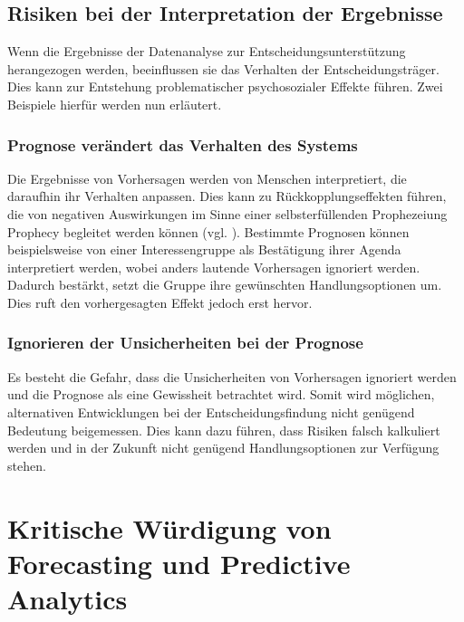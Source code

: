 \subsection{Risiken bei der Interpretation der Ergebnisse}

Wenn die Ergebnisse der Datenanalyse zur Entscheidungsunterstützung herangezogen
werden, beeinflussen sie das Verhalten der Entscheidungsträger. Dies kann zur
Entstehung problematischer psychosozialer Effekte führen. Zwei Beispiele hierfür
werden nun erläutert.

\subsubsection{Prognose verändert das Verhalten des Systems }

Die Ergebnisse von Vorhersagen werden von Menschen interpretiert,
die daraufhin ihr Verhalten anpassen. Dies kann zu Rückkopplungseffekten führen,
die von negativen Auswirkungen im Sinne einer selbsterfüllenden Prophezeiung
 Prophecy\grqq{} begleitet werden können
(vgl. \cite{Crossman}). Bestimmte Prognosen können beispielsweise von einer 
Interessengruppe als Bestätigung ihrer Agenda interpretiert werden, wobei
anders lautende Vorhersagen ignoriert werden. Dadurch bestärkt, setzt die Gruppe
ihre gewünschten Handlungsoptionen um. Dies ruft den vorhergesagten Effekt
jedoch erst hervor.

\subsubsection{Ignorieren der Unsicherheiten bei der Prognose}

Es besteht die Gefahr, dass die Unsicherheiten von Vorhersagen ignoriert werden
und die Prognose als eine Gewissheit betrachtet wird. Somit wird möglichen,
alternativen Entwicklungen bei der Entscheidungsfindung nicht genügend Bedeutung
beigemessen. Dies kann dazu führen, dass Risiken falsch kalkuliert werden und
in der Zukunft nicht genügend Handlungsoptionen zur Verfügung stehen.

\section{Kritische Würdigung von Forecasting und Predictive Analytics}



